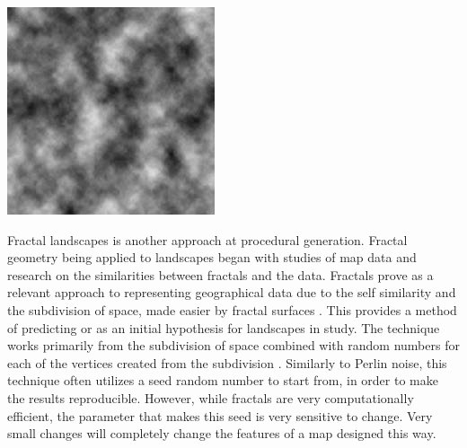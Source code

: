 \documentclass[10pt]{report}
\begin{document}
		\begin{minipage}{\textwidth}
			\centering
			\includegraphics[scale=1]{lect14-perlin}
			\label{fig:fig1}
		\end{minipage}

		Fractal landscapes is another approach at procedural generation. Fractal geometry being applied to landscapes began with studies of map data and research on the similarities between fractals and the data. Fractals prove as a relevant approach to representing geographical data due to the self similarity and the subdivision of space, made easier by fractal surfaces \cite{doi:10.1111/j.1467-8306.1987.tb00158.x}. This provides a method of predicting or as an initial hypothesis for landscapes in study. The technique works primarily from the subdivision of space combined with random numbers for each of the vertices created from the subdivision \cite{fractal-land}. Similarly to Perlin noise, this technique often utilizes a seed random number to start from, in order to make the results reproducible. However, while fractals are very computationally efficient, the parameter that makes this seed is very sensitive to change. Very small changes will completely change the features of a map designed this way.
		
\end{document}
